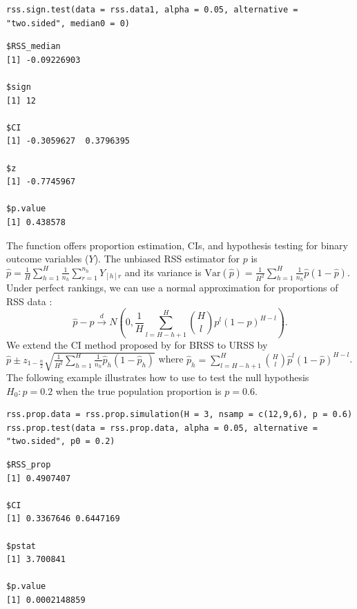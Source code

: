 \begin{verbatim}
rss.sign.test(data = rss.data1, alpha = 0.05, alternative = "two.sided", median0 = 0)
\end{verbatim}
\begin{verbatim}
$RSS_median
[1] -0.09226903

$sign
[1] 12

$CI
[1] -0.3059627  0.3796395

$z
[1] -0.7745967

$p.value
[1] 0.438578
\end{verbatim}
%

The  function offers proportion estimation, CIs, and hypothesis testing for binary outcome variables ($Y$). The unbiased RSS estimator for $p$ is $\hat{p}=\frac{1}{H}\sum_{h=1}^H\frac{1}{n_h}\sum_{r=1}^{n_h}Y_{[h]r}$ and its variance is $\text{Var}(\hat{p})=\frac{1}{H^2}\sum_{h=1}^{H}\frac{1}{n_h}\hat{p}(1-\hat{p})$. Under perfect rankings, we can use a normal approximation for proportions of RSS data \citep{chen2006unbalanced,ahn2022continuity}:
\begin{equation} \nonumber 
\hat{p}-p \overset{d}{\longrightarrow}N\left(0,\frac{1}{H} \sum_{l=H-h+1}^H \binom{H}{l}p^l(1-p)^{H-l} \right).
\end{equation} 
We extend the CI method proposed by \cite{zamanzade2020using} for BRSS to URSS by $\hat{p} \pm z_{1-\frac{\alpha}{2}}\sqrt{\frac{1}{H^2}\sum_{h=1}^H \frac{1}{n_h}\hat{p}_h(1-\hat{p}_h)}$ where $\hat{p}_h=\sum_{l=H-h+1}^H \binom{H}{l}\hat{p}^l(1-\hat{p})^{H-l}$. The following example illustrates how to use  to test the null hypothesis $H_0: p=0.2$ when the true population proportion is $p=0.6$.
%

\begin{verbatim}
rss.prop.data = rss.prop.simulation(H = 3, nsamp = c(12,9,6), p = 0.6)
rss.prop.test(data = rss.prop.data, alpha = 0.05, alternative = "two.sided", p0 = 0.2)
\end{verbatim}
\begin{verbatim}
$RSS_prop
[1] 0.4907407

$CI
[1] 0.3367646 0.6447169

$pstat
[1] 3.700841

$p.value
[1] 0.0002148859
\end{verbatim}
%

